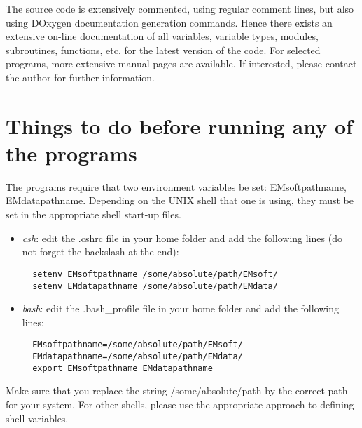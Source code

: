 \documentclass[DIV=calc, paper=letter, fontsize=11pt]{scrartcl}	 %
\newcommand{\ctp}{\textsf{EMsoft}}
\begin{document}
The source code is extensively commented, using regular comment lines, but also using DOxygen documentation generation commands.  Hence
there exists an extensive on-line documentation of all variables, variable types, modules, subroutines, functions, etc. for the latest version 
of the code.  For selected programs, more extensive manual pages are available.  If interested, please contact the author for further information.

%
%
%


\newpage
\section{Things to do before running any of the programs\label{sec:todo}}
The programs require that two environment variables be set: \textsf{EMsoftpathname},
\textsf{EMdatapathname}.  Depending on the UNIX shell that one is using, they must be set in
the appropriate shell start-up files.

\begin{itemize}
\item \textit{csh}: edit the \textsf{.cshrc} file in your home folder and add the following lines (do not forget the backslash at the end):
\begin{verbatim}
  setenv EMsoftpathname /some/absolute/path/EMsoft/
  setenv EMdatapathname /some/absolute/path/EMdata/
\end{verbatim}
\item \textit{bash}: edit the \textsf{.bash\_profile} file in your home folder and add the following lines:
\begin{verbatim}
  EMsoftpathname=/some/absolute/path/EMsoft/
  EMdatapathname=/some/absolute/path/EMdata/
  export EMsoftpathname EMdatapathname
\end{verbatim}
\end{itemize}
Make sure that you replace the string \textsf{/some/absolute/path} by the correct path for your system.
For other shells, please use the appropriate approach to defining shell variables.
\end{document}
